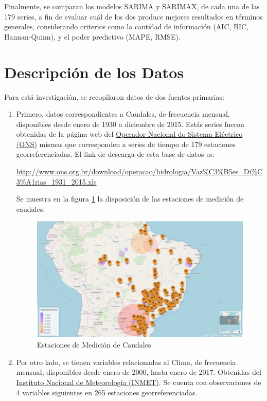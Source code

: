 \documentclass[12pt,oneside]{book}\usepackage[]{graphicx}\usepackage[]{color}
\theoremstyle{definition} %
\begin{document}
Finalmente, se comparan los modelos SARIMA y SARIMAX, de cada una de las 179 series, a fin de evaluar cuál de los dos produce mejores resultados en términos generales, considerando criterios como la cantidad de información (AIC, BIC, Hannan-Quinn), y el poder predictivo (MAPE, RMSE).


\section{Descripción de los Datos}

Para está investigación, se recopilaron datos de dos fuentes primarias:

\begin{enumerate}

\item Primero, datos correspondientes a Caudales, de frecuencia mensual, disponibles desde enero de 1930 a diciembre de 2015. Estás series fueron obtenidas de la página web del \href{http://www.ons.org.br/}{Operador Nacional do Sistema Eléctrico (ONS)} mismas que corresponden a series de tiempo de 179 estaciones georreferenciadas. El link de descarga de esta base de datos es:

\url{http://www.ons.org.br/download/operacao/hidrologia/Vaz%C3%B5es_Di%C3%A1rias_1931_2015.xls}

Se muestra en la figura \ref{fig:mapa_vaz} la disposición de las estaciones de medición de caudales.


\begin{figure}[H]
	\centering
	\includegraphics[scale=0.5]{map_estacVz}
	\caption{Estaciones de Medición de Caudales}\label{fig:mapa_vaz}
\end{figure}



\item Por otro lado, se tienen variables relacionadas al Clima, de frecuencia mensual, disponibles desde enero de 2000, hasta enero de 2017. Obtenidas del \href{http://www.inmet.gov.br/portal/}{Instituto Nacional de Meteorología (INMET)}. Se cuenta con observaciones de 4 variables siguientes en 265 estaciones georreferenciadas.


\end{enumerate}
\end{document}

